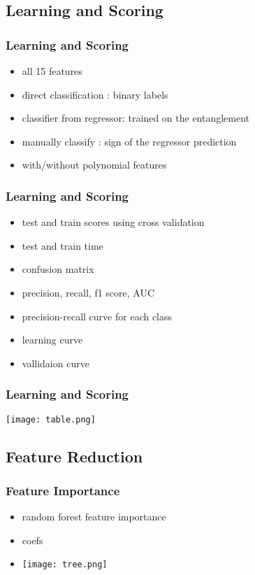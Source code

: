 \documentclass[11pt]{beamer}
\begin{document}
\subsection{Learning and Scoring}
\begin{frame}
\frametitle{Learning and Scoring}

\begin{itemize}
 \item all 15 features
 \item direct classification : binary labels
 \item classifier from regressor: trained on the entanglement
 \item manually classify : sign of the regressor prediction
 \item with/without polynomial features
\end{itemize}

\end{frame}


\begin{frame}
\frametitle{Learning and Scoring}


\begin{itemize}
 \item test and train scores using cross validation
 \item test and train time
 \item confusion matrix
 \item  precision, recall, f1 score, AUC
 \item precision-recall curve for each class
 \item learning curve
 \item vallidaion curve
\end{itemize}


\end{frame}



\begin{frame}
\frametitle{Learning and Scoring}

\texttt{[image: table.png]}

\end{frame}

\subsection{Feature Reduction}
\begin{frame}
\frametitle{Feature Importance}

\begin{itemize}
 \item random forest feature importance
 \item coefs
 \item \texttt{[image: tree.png]}
\end{itemize}

\end{frame}
\end{document}
